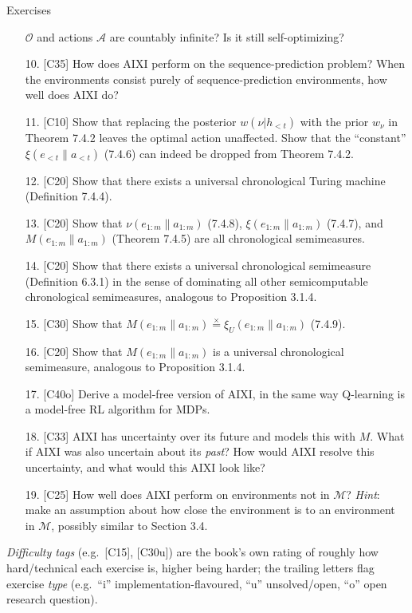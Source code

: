 \documentclass[aspectratio=169,10pt]{beamer}
\newcommand{\Mcal}{\mathcal{M}}
\newcommand{\Acal}{\mathcal{A}}
\begin{document}
\begin{frame}[allowframebreaks]{Exercises}
\begin{enumerate}
      $\mathcal O$ and actions $\Acal$ are countably infinite? Is it still
      self-optimizing?
    \item[10.] [C35] How does AIXI perform on the sequence-prediction
      problem? When the environments consist purely of sequence-prediction
      environments, how well does AIXI do?
    \item[11.] [C10] Show that replacing the posterior $w(\nu|h_{<t})$ with
      the prior $w_\nu$ in Theorem 7.4.2 leaves the optimal action
      unaffected. Show that the ``constant'' $\xi(e_{<t}\|a_{<t})$ (7.4.6)
      can indeed be dropped from Theorem 7.4.2.
    \item[12.] [C20] Show that there exists a universal chronological
      Turing machine (Definition 7.4.4).
    \item[13.] [C20] Show that $\nu(e_{1:m}\|a_{1:m})$ (7.4.8),
      $\xi(e_{1:m}\|a_{1:m})$ (7.4.7), and $M(e_{1:m}\|a_{1:m})$ (Theorem
      7.4.5) are all chronological semimeasures.
    \item[14.] [C20] Show that there exists a universal chronological
      semimeasure (Definition 6.3.1) in the sense of dominating all other
      semicomputable chronological semimeasures, analogous to Proposition
      3.1.4.
    \item[15.] [C30] Show that $M(e_{1:m}\|a_{1:m})\stackrel{\times}{=}
      \xi_U(e_{1:m}\|a_{1:m})$ (7.4.9).
    \item[16.] [C20] Show that $M(e_{1:m}\|a_{1:m})$ is a universal
      chronological semimeasure, analogous to Proposition 3.1.4.
    \item[17.] [C40o] Derive a model-free version of AIXI, in the same way
      Q-learning is a model-free RL algorithm for MDPs.
    \item[18.] [C33] AIXI has uncertainty over its future and models this
      with $M$. What if AIXI was also uncertain about its \emph{past}? How
      would AIXI resolve this uncertainty, and what would this AIXI look
      like?
    \item[19.] [C25] How well does AIXI perform on environments not in
      $\Mcal$? \emph{Hint}: make an assumption about how close the
      environment is to an environment in $\Mcal$, possibly similar to
      Section 3.4.
  \end{enumerate}
  \small\textit{Difficulty tags} (e.g.\ [C15], [C30u]) are the book's own
  rating of roughly how hard/technical each exercise is, higher being
  harder; the trailing letters flag exercise \emph{type} (e.g.\ ``i''
  implementation-flavoured, ``u'' unsolved/open, ``o'' open research
  question).
\end{frame}
\end{document}

